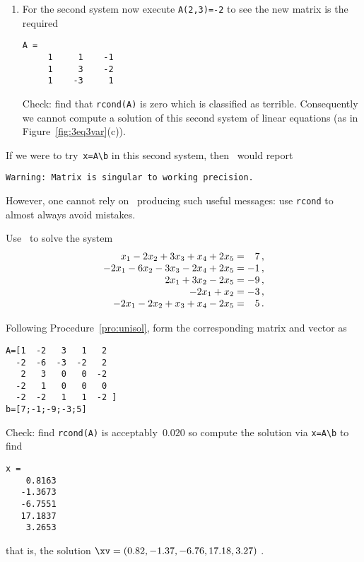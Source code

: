 \begin{example}
\begin{solution}
\begin{enumerate}
\item For the second system now execute \verb|A(2,3)=-2| to see the new matrix is the required
\begin{verbatim}
A =
     1     1    -1
     1     3    -2
     1    -3     1
\end{verbatim}
Check: find that \verb|rcond(A)| is zero which is classified as terrible.
Consequently we cannot compute a solution of this second system of linear equations (as in Figure~\ref{fig:3eq3var}(c)).
\end{enumerate}
If we were to try~\verb|x=A\b| in this second system, then \script\ would report
\begin{verbatim}
Warning: Matrix is singular to working precision. 
\end{verbatim}
However, one cannot rely on \script\ producing such useful messages: use \verb|rcond| to almost always avoid mistakes.
\end{solution}
\end{example}



\begin{example} \label{eg:5eqns5vars}
Use \script\ to solve the system
\begin{equation*}
\begin{array}{r@{{}={}}r}
x_1-2x_2+3x_3+x_4+2x_5&7\,,\\
-2x_1-6x_2-3x_3-2x_4+2x_5&-1\,,\\
2x_1+3x_2-2x_5&-9\,,\\
-2x_1+x_2&-3\,,\\
-2x_1-2x_2+x_3+x_4-2x_5&5\,.
\end{array}
\end{equation*}

\begin{solution} 
Following Procedure~\ref{pro:unisol}, form the corresponding matrix and vector as
\begin{verbatim}
A=[1  -2   3   1   2
  -2  -6  -3  -2   2
   2   3   0   0  -2
  -2   1   0   0   0
  -2  -2   1   1  -2 ]
b=[7;-1;-9;-3;5]
\end{verbatim}
Check: find \verb|rcond(A)| is acceptably~\(0.020\) so compute the solution via \verb|x=A\b| to find
\setbox\ajrqrbox\hbox{}%
\marginpar{\usebox{\ajrqrbox\\[2ex]}}%
\begin{verbatim}
x =
    0.8163
   -1.3673
   -6.7551
   17.1837
    3.2653
\end{verbatim}
that is, the solution \(\xv=(0.82,-1.37,-6.76,17.18,3.27)\) \twodp.
\end{solution}
\end{example}


